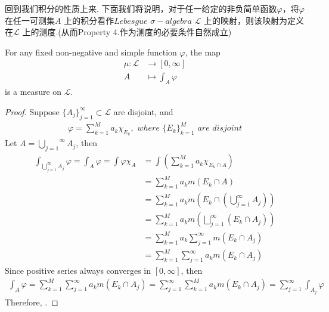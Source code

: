 \begin{enumerate}
\begin{rmk}
			\vspace{2em}
			回到我们积分的性质上来. 下面我们将说明，对于任一给定的非负简单函数$\varphi$，将$\varphi$ 在任一可测集$A$ 上的积分看作$Lebesgue \,\, \sigma-algebra \,\, \mathcal{L}$ 上的映射，则该映射为定义在$\mathcal{L}$ 上的测度.(从而Property 4.作为测度的必要条件自然成立)
			
			\vspace{2em}
			\begin{proposition}\label{prop 3.1.1}
				For any fixed non-negative and simple function $\varphi$, the map
				\begin{align}
					\mu : \mathcal{L} &\longrightarrow [0 , \infty] \\
					A &\longmapsto \int_{A}{\varphi}
				\end{align}
				is a measure on $\mathcal{L}$.
				
				\newpage
				\begin{proof}
					Suppose $\{ A_j \}_{j = 1}^{\infty} \subset \mathcal{L}$ are disjoint, and
					\begin{align}
						\varphi = \sum_{k = 1}^{M}{a_k \chi_{E_k}} , \,\, where \,\, \{ E_k \}_{k = 1}^{M} \,\, are \,\, disjoint
					\end{align}
					Let $A = \overset{\infty}{\underset{j = 1}{\bigcup}}{A_j}$, then
					\begin{align}
						\int_{\bigcup_{j = 1}^{\infty}{A_j}}{\varphi} 
						= \int_{A}{\varphi} 
						= \int{\varphi \chi_A} 
						&= \int{(\sum_{k = 1}^{M}{a_k \chi_{E_k \cap A}})} \\
						&= \sum_{k = 1}^{M}{a_k m(E_k \cap A)} \\
						&= \sum_{k = 1}^{M}{a_k m(E_k \cap (\bigcup_{j = 1}^{\infty}{A_j}))} \\
						&= \sum_{k = 1}^{M}{a_k m(\bigsqcup_{j = 1}^{\infty}{(E_k \cap A_j)})} \\
						&= \sum_{k = 1}^{M}{a_k \sum_{j = 1}^{\infty}{m(E_k \cap A_j)}} \\
						&= \sum_{k = 1}^{M}{\sum_{j = 1}^{\infty}{a_k m(E_k \cap A_j)}}
					\end{align}
					Since positive series always converges in $[0 , \infty]$, then
					\begin{align}
						\int_{A}{\varphi} 
						= \sum_{k = 1}^{M}{\sum_{j = 1}^{\infty}{a_k m(E_k \cap A_j)}} 
						= \sum_{j = 1}^{\infty}{\sum_{k = 1}^{M}{a_k m(E_k \cap A_j)}} 
						= \sum_{j = 1}^{\infty}{\int_{A_j}{\varphi}}
					\end{align}
					Therefore, .
				\end{proof}
			\end{proposition}
		\end{rmk}
	\end{enumerate}

